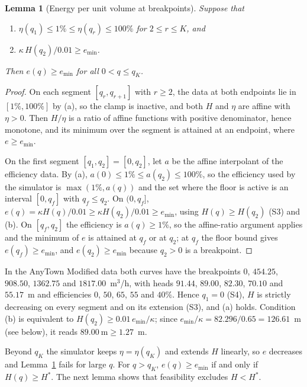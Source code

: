 \documentclass[11pt]{article}
\newtheorem{lemma}{Lemma}
\theoremstyle{remark}
\newcommand{\emin}{e_{\min}}
\begin{document}
\begin{lemma}[Energy per unit volume at breakpoints]\label{lem:energy}
Suppose that
\begin{enumerate}
  \item[(a)] $\eta(q_1) \le 1\% \le \eta(q_r) \le 100\%$ for $2 \le r \le K$, and
  \item[(b)] $\kappa\, H(q_2) / 0.01 \ge \emin$.
\end{enumerate}
Then $e(q) \ge \emin$ for all $0 < q \le q_K$.
\end{lemma}

\begin{proof}
On each segment $[q_r, q_{r+1}]$ with $r \ge 2$, the data at both endpoints lie in
$[1\%, 100\%]$ by (a), so the clamp is inactive, and both $H$ and $\eta$ are affine with
$\eta > 0$. Then $H/\eta$ is a ratio of affine functions with positive denominator, hence
monotone, and its minimum over the segment is attained at an endpoint, where
$e \ge \emin$.

On the first segment $[q_1, q_2] = [0, q_2]$, let $a$ be the affine interpolant of the
efficiency data. By (a), $a(0) \le 1\% \le a(q_2) \le 100\%$, so the efficiency used by the
simulator is $\max(1\%, a(q))$ and the set where the floor is active is an interval
$[0, q_f]$ with $q_f \le q_2$. On $(0, q_f]$, $e(q) = \kappa H(q)/0.01 \ge \kappa
H(q_2)/0.01 \ge \emin$, using $H(q) \ge H(q_2)$ (S3) and (b). On $[q_f, q_2]$ the
efficiency is $a(q) \ge 1\%$, so the affine-ratio argument applies and the minimum of $e$
is attained at $q_f$ or at $q_2$; at $q_f$ the floor bound gives $e(q_f) \ge \emin$, and
$e(q_2) \ge \emin$ because $q_2 > 0$ is a breakpoint.
\end{proof}

In the AnyTown Modified data both curves have the breakpoints $0$, $454.25$, $908.50$,
$1362.75$ and $1817.00$~m$^3$/h, with heads $91.44$, $89.00$, $82.30$, $70.10$ and
$55.17$~m and efficiencies $0$, $50$, $65$, $55$ and $40\%$. Hence $q_1 = 0$ (S4), $H$ is
strictly decreasing on every segment and on its extension (S3), and (a) holds. Condition
(b) is equivalent to $H(q_2) \ge 0.01\, \emin/\kappa$; since $\emin/\kappa = 82.296/0.65
= 126.61$~m (see below), it reads $89.00~\mathrm{m} \ge 1.27$~m.

Beyond $q_K$ the simulator keeps $\eta = \eta(q_K)$ and extends $H$ linearly, so $e$
decreases and Lemma~\ref{lem:energy} fails for large $q$. For $q > q_K$,
$e(q) \ge \emin$ if and only if $H(q) \ge H^*$. The next lemma shows that feasibility
excludes $H < H^*$.
\end{document}
